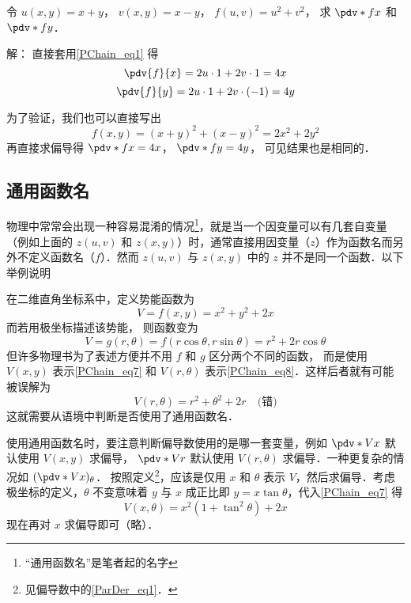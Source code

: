 \begin{example}{}
令 $u(x,y) = x + y$， $v(x,y) = x - y$， $f(u, v) = u^2 + v^2$， 求 $\pdv*{f}{x}$ 和 $\pdv*{f}{y}$．

解： 直接套用\autoref{PChain_eq1} 得
\begin{equation}
\pdv{f}{x} = 2u \cdot 1 + 2v \cdot 1 = 4x
\end{equation}
\begin{equation}
\pdv{f}{y} = 2u \cdot 1 + 2v \cdot (-1) = 4y
\end{equation}

为了验证，我们也可以直接写出
\begin{equation}
f(x, y) = (x+y)^2 + (x-y)^2 = 2x^2 + 2y^2
\end{equation}
再直接求偏导得 $\pdv*{f}{x} = 4x$， $\pdv*{f}{y} = 4y$， 可见结果也是相同的．
\end{example}

\subsection{通用函数名}
物理中常常会出现一种容易混淆的情况\footnote{“通用函数名”是笔者起的名字}，就是当一个因变量可以有几套自变量（例如上面的 $z(u,v)$ 和 $z(x,y)$）时，通常直接用因变量（$z$）作为函数名而另外不定义函数名（$f$）．然而 $z(u,v)$ 与 $z(x,y)$ 中的 $z$ 并不是同一个函数．以下举例说明

\begin{example}{}\label{PChain_ex1}
在二维直角坐标系中，定义势能函数为
\begin{equation}\label{PChain_eq7}
V=f(x,y)=x^2+y^2+2x
\end{equation}
而若用极坐标描述该势能， 则函数变为
\begin{equation}\label{PChain_eq8}
V = g(r,\theta) = f(r\cos \theta , r\sin \theta ) = r^2 + 2r\cos \theta
\end{equation}
但许多物理书为了表述方便并不用 $f$ 和 $g$ 区分两个不同的函数， 而是使用 $V(x,y)$ 表示\autoref{PChain_eq7} 和 $V(r,\theta)$ 表示\autoref{PChain_eq8}．这样后者就有可能被误解为
\begin{equation}
V(r,\theta) = r^2+\theta^2+2r \quad \text{(错)}
\end{equation}
这就需要从语境中判断是否使用了通用函数名．

使用通用函数名时，要注意判断偏导数使用的是哪一套变量，例如 $\pdv*{V}{x}$ 默认使用 $V(x,y)$ 求偏导， $\pdv*{V}{r}$ 默认使用 $V(r,\theta)$ 求偏导．一种更复杂的情况如 $(\pdv*{V}{x})_\theta$． 按照定义\footnote{见偏导数中的\autoref{ParDer_eq1}．}，应该是仅用 $x$ 和 $\theta$ 表示 $V$，然后求偏导．考虑极坐标的定义，$\theta$ 不变意味着 $y$ 与 $x$ 成正比即 $y=x\tan\theta$，代入\autoref{PChain_eq7} 得
\begin{equation}
V(x,\theta)=x^2(1+\tan^2 \theta) + 2x
\end{equation}
现在再对 $x$ 求偏导即可（略）．
\end{example}

